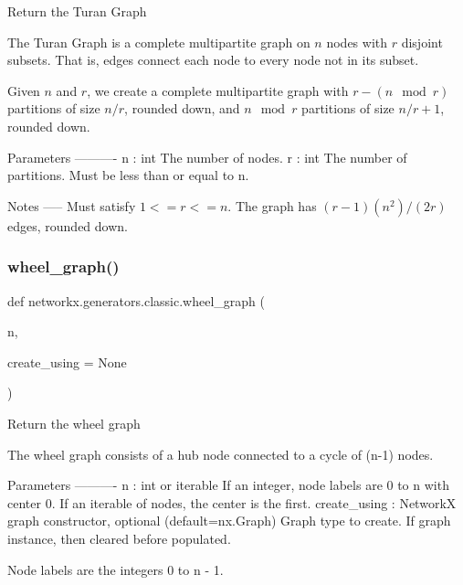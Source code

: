 \begin{DoxyVerb}Return the Turan Graph

The Turan Graph is a complete multipartite graph on $n$ nodes
with $r$ disjoint subsets. That is, edges connect each node to
every node not in its subset.

Given $n$ and $r$, we create a complete multipartite graph with
$r-(n \mod r)$ partitions of size $n/r$, rounded down, and
$n \mod r$ partitions of size $n/r+1$, rounded down.

Parameters
----------
n : int
    The number of nodes.
r : int
    The number of partitions.
    Must be less than or equal to n.

Notes
-----
Must satisfy $1 <= r <= n$.
The graph has $(r-1)(n^2)/(2r)$ edges, rounded down.
\end{DoxyVerb}
 \mbox{\label{namespacenetworkx_1_1generators_1_1classic_ac26d38d589cb04117e9476e3b5d5d62d}} 
\subsubsection{\texorpdfstring{wheel\+\_\+graph()}{wheel\_graph()}}
{\footnotesize\ttfamily def networkx.\+generators.\+classic.\+wheel\+\_\+graph (\begin{DoxyParamCaption}\item[{}]{n,  }\item[{}]{create\+\_\+using = {\ttfamily None} }\end{DoxyParamCaption})}

\begin{DoxyVerb}Return the wheel graph

The wheel graph consists of a hub node connected to a cycle of (n-1) nodes.

Parameters
----------
n : int or iterable
    If an integer, node labels are 0 to n with center 0.
    If an iterable of nodes, the center is the first.
create_using : NetworkX graph constructor, optional (default=nx.Graph)
   Graph type to create. If graph instance, then cleared before populated.

Node labels are the integers 0 to n - 1.
\end{DoxyVerb}
 